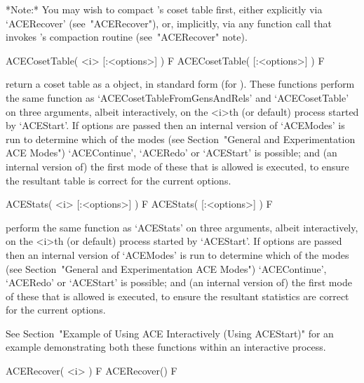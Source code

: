 \endlist

*Note:*
You may wish to compact {\ACE}'s coset table first, either  explicitly
via `ACERecover' (see~"ACERecover"), or, implicitly, via any  function
call that invokes {\ACE}'s compaction routine (see~"ACERecover" note).

\enditems


\beginitems

\>ACECosetTable( <i> [:<options>] ) F
\>ACECosetTable( [:<options>] ) F

return a coset table  as  a  {\GAP}  object,  in  standard  form  (for
{\GAP}).   These   functions   perform   the    same    function    as
`ACECosetTableFromGensAndRels' and `ACECosetTable' on three arguments,
albeit interactively, on the <i>th (or  default)  process  started  by
`ACEStart'.  If  options  are  passed  then  an  internal  version  of
`ACEModes'  is  run   to   determine   which   of   the   modes   (see
Section~"General  and  Experimentation  ACE   Modes")   `ACEContinue',
`ACERedo' or `ACEStart' is possible; and (an internal version of)  the
first mode of these  that  is  allowed  is  executed,  to  ensure  the
resultant table is correct for the current options.

\>ACEStats( <i> [:<options>] ) F
\>ACEStats( [:<options>] ) F

perform the same function as `ACEStats'  on  three  arguments,  albeit
interactively,  on  the  <i>th  (or  default)   process   started   by
`ACEStart'.  If  options  are  passed  then  an  internal  version  of
`ACEModes'  is  run   to   determine   which   of   the   modes   (see
Section~"General  and  Experimentation  ACE   Modes")   `ACEContinue',
`ACERedo' or `ACEStart' is possible; and (an internal version of)  the
first mode of these  that  is  allowed  is  executed,  to  ensure  the
resultant statistics are correct for the current options.

See Section~"Example of Using ACE Interactively (Using ACEStart)"  for
an example demonstrating both these functions  within  an  interactive
process.

\enditems


\beginitems

\>ACERecover( <i> ) F
\>ACERecover() F

